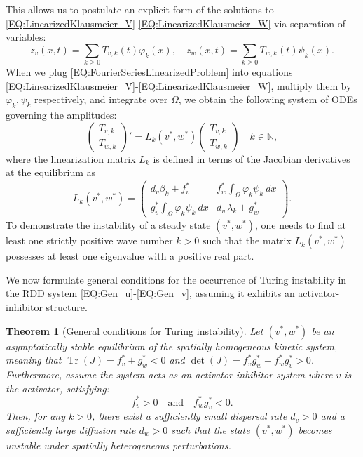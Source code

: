 \documentclass[11pt, a4paper]{article}
\theoremstyle{break}
\newtheorem{thm}{Theorem}[section]
\theoremstyle{break}
\theoremstyle{break}
\theoremstyle{break}
\theoremstyle{break}
\theoremstyle{break}
\theoremstyle{break}
\theoremstyle{break}
\theoremstyle{break}
\DeclareMathOperator{\Tr}{Tr}
\begin{document}
This allows us to postulate an explicit form of the solutions to \eqref{EQ:LinearizedKlausmeier_V}-\eqref{EQ:LinearizedKlausmeier_W} via separation of variables:
\begin{equation}
    \label{EQ:FourierSeriesLinearizedProblem}
    z_v(x,t) = \sum_{k \geq 0} T_{v, k}(t) \varphi_k(x), \quad z_w(x,t) = \sum_{k \geq 0} T_{w, k}(t) \psi_k(x).
\end{equation}
When we plug \eqref{EQ:FourierSeriesLinearizedProblem} into equations \eqref{EQ:LinearizedKlausmeier_V}-\eqref{EQ:LinearizedKlausmeier_W}, multiply them by $\varphi_k, \psi_k$ respectively, and integrate over $\Omega$, we obtain the following system of ODEs governing the amplitudes:
\begin{equation}
    \label{EQ:ODEFORT_V_T_W}
    \begin{pmatrix}
        T_{v, k} \\ T_{w, k}
    \end{pmatrix}'
    =
    L_k(v^*, w^*)
    \begin{pmatrix}
        T_{v, k} \\ T_{w, k}
    \end{pmatrix}
    \quad 
    k \in \mathbb{N},
\end{equation}
where the linearization matrix $L_k$ is defined in terms of the Jacobian derivatives at the equilibrium as
\begin{equation}
    \label{EQ:GeneralLinearizationMatrix}
    L_k(v^*, w^*) = 
    \begin{pmatrix}
        d_v \beta_k + f_v^* & f_w^* \int_\Omega \varphi_k \psi_k \:dx \\
        g_v^* \int_\Omega \varphi_k \psi_k \:dx & d_w \lambda_k + g_w^*
    \end{pmatrix}.
\end{equation}
To demonstrate the instability of a steady state $(v^*, w^*)$, one needs to find at least one strictly positive wave number $k > 0$ such that the matrix $L_k(v^*, w^*)$ possesses at least one eigenvalue with a positive real part. 

We now formulate general conditions for the occurrence of Turing instability in the RDD system \eqref{EQ:Gen_u}-\eqref{EQ:Gen_v}, assuming it exhibits an activator-inhibitor structure.

\begin{thm}[General conditions for Turing instability]
    \label{lem:general_turing_instability}
    Let $(v^*, w^*)$ be an asymptotically stable equilibrium of the spatially homogeneous kinetic system, meaning that $\Tr(J) = f_v^* + g_w^* < 0$ and $\det(J) = f_v^* g_w^* - f_w^* g_v^* > 0$. Furthermore, assume the system acts as an activator-inhibitor system where $v$ is the activator, satisfying:
    \begin{equation}
        \label{eq:activator_inhibitor_conditions}
        f_v^* > 0 \quad \text{and} \quad f_w^* g_v^* < 0.
    \end{equation}
    Then, for any $k > 0$, there exist a sufficiently small dispersal rate $d_v > 0$ and a sufficiently large diffusion rate $d_w > 0$ such that the state $(v^*, w^*)$ becomes unstable under spatially heterogeneous perturbations.
\end{thm}
\end{document}
